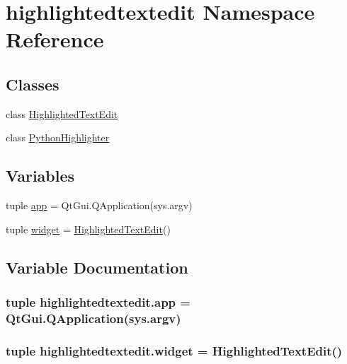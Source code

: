 \hypertarget{namespacehighlightedtextedit}{}\section{highlightedtextedit Namespace Reference}
\label{namespacehighlightedtextedit}
\subsection*{Classes}
\begin{DoxyCompactItemize}
\item 
class \hyperlink{classhighlightedtextedit_1_1HighlightedTextEdit}{Highlighted\+Text\+Edit}
\item 
class \hyperlink{classhighlightedtextedit_1_1PythonHighlighter}{Python\+Highlighter}
\end{DoxyCompactItemize}
\subsection*{Variables}
\begin{DoxyCompactItemize}
\item 
tuple \hyperlink{namespacehighlightedtextedit_a1661278d04d0a8f4e88487520da74366}{app} = Qt\+Gui.\+Q\+Application(sys.\+argv)
\item 
tuple \hyperlink{namespacehighlightedtextedit_aa32ac0bfecd0bd59d9dea76baa135c86}{widget} = \hyperlink{classhighlightedtextedit_1_1HighlightedTextEdit}{Highlighted\+Text\+Edit}()
\end{DoxyCompactItemize}


\subsection{Variable Documentation}
\hypertarget{namespacehighlightedtextedit_a1661278d04d0a8f4e88487520da74366}{}
\subsubsection[{app}]{\setlength{\rightskip}{0pt plus 5cm}tuple highlightedtextedit.\+app = Qt\+Gui.\+Q\+Application(sys.\+argv)}\label{namespacehighlightedtextedit_a1661278d04d0a8f4e88487520da74366}
\hypertarget{namespacehighlightedtextedit_aa32ac0bfecd0bd59d9dea76baa135c86}{}
\subsubsection[{widget}]{\setlength{\rightskip}{0pt plus 5cm}tuple highlightedtextedit.\+widget = {\bf Highlighted\+Text\+Edit}()}\label{namespacehighlightedtextedit_aa32ac0bfecd0bd59d9dea76baa135c86}
